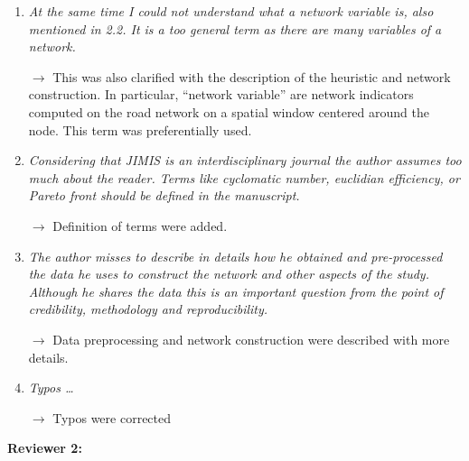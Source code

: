 \documentclass[11pt,a4paper,sans]{moderncv}        %
\begin{document}
\begin{enumerate}
\item \textit{At the same time I could not understand what a network variable is, also mentioned in 2.2. It is a too general term as there are many variables of a network.}

$\rightarrow$ This was also clarified with the description of the heuristic and network construction. In particular, ``network variable'' are network indicators computed on the road network on a spatial window centered around the node. This term was preferentially used.

\medskip

\item \textit{Considering that JIMIS is an interdisciplinary journal the author assumes too much about the reader. Terms like cyclomatic number, euclidian efficiency, or Pareto front should be defined in the manuscript.}

$\rightarrow$ Definition of terms were added.

\medskip

\item \textit{The author misses to describe in details how he obtained and pre-processed the data he uses to construct the network and other aspects of the study. Although he shares the data this is an important question from the point of credibility, methodology and reproducibility.}

$\rightarrow$ Data preprocessing and network construction were described with more details.

\medskip

\item \textit{Typos \ldots}
 
$\rightarrow$ Typos were corrected

\end{enumerate}


\bigskip

\textbf{Reviewer 2:}

\medskip
\end{document}

